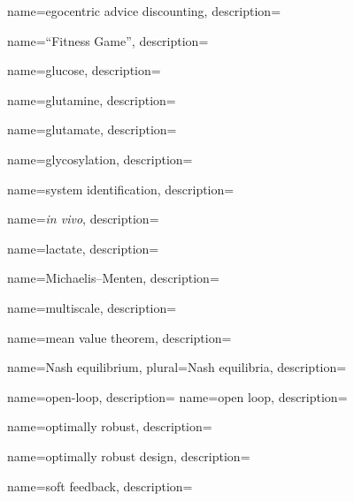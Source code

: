 
	{
		name={egocentric advice discounting},
		description={}
	}


	{
		name={``Fitness Game''},
		description={}
	}


	{
		name={glucose},
		description={}
	}
	
	{
		name={glutamine},
		description={}
	}	
	
	{
		name={glutamate},
		description={}
	}		


	{
		name={glycosylation},
		description={}
	}	
	

	{
		name={system identification},
		description={}
	}

	{
		name={\emph{in vivo}},		
		description={}
	}
	

	{
		name={lactate},
		description={}
	}	
	

	{
		name={Michaelis--Menten},
		description={}
	}		


	{
		name={multiscale},
		description={}
	}		


	{
		name={mean value theorem},
		description={}
	}		
	

	{
		name={Nash equilibrium},
		plural={Nash equilibria},
		description={}
	}
	

	{
		name={open-loop},
		description={}
	}
	{
		name={open loop},
		description={}
	}	

	{
		name={optimally robust},
		description={}
	}
	
	{
		name={optimally robust design},
		description={}
	}


	{
		name={soft feedback},
		description={}
	}

